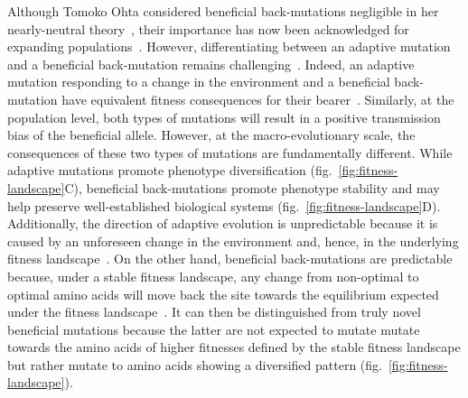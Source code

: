 \documentclass[9pt,twocolumn,twoside,lineno]{pnas-new}
\begin{document}
Although Tomoko Ohta considered beneficial back-mutations negligible in her nearly-neutral theory~\cite{Ohta1992}, their importance has now been acknowledged for
expanding populations~\cite{charlesworth_other_2007}.
However, differentiating between an adaptive mutation and a beneficial back-mutation remains challenging~\cite{chi_detecting_2020}.
Indeed, an adaptive mutation responding to a change in the environment and a beneficial back-mutation have equivalent fitness consequences for their bearer~\cite{charlesworth_other_2007}.
Similarly, at the population level, both types of mutations will result in a positive transmission bias of the beneficial allele.
However, at the macro-evolutionary scale, the consequences of these two types of mutations are fundamentally different.
While adaptive mutations promote phenotype diversification (fig.~\ref{fig:fitness-landscape}C), beneficial back-mutations promote phenotype stability and may help preserve well-established biological systems (fig.~\ref{fig:fitness-landscape}D).
Additionally, the direction of adaptive evolution is unpredictable because it is caused by an unforeseen change in the environment and, hence, in the underlying fitness landscape~\cite{bazykin_changing_2015}.
On the other hand, beneficial back-mutations are predictable because, under a stable fitness landscape, any change from non-optimal to optimal amino acids will move back the site towards the equilibrium expected under the fitness landscape~\cite{moses_inferring_2009, fischer_germline_2011, chen_hunting_2021}.
It can then be distinguished from truly novel beneficial mutations because the latter are not expected to mutate mutate towards the amino acids of higher fitnesses defined by the stable fitness landscape but rather mutate to amino acids showing a diversified pattern (fig.~\ref{fig:fitness-landscape}).
\end{document}
